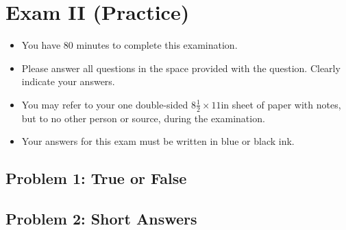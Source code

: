 \chapter{Exam II (Practice)}
\label{ch:examii-practice}

\begin{cluster}
\label{grp:prmbl:examii-practice::minutes}

\begin{preamble}
\label{prmbl:examii-practice::minutes}
\begin{itemize}
\item You have 80 minutes to complete this examination.
\item Please answer all questions in the space provided with the
  question.  Clearly indicate your answers.
\item You may refer to your one double-sided $8\frac{1}{2} \times 11$in
  sheet of paper with notes, but to no other person or source, during the
  examination.

\item Your answers for this exam must be written in blue or black ink.

\end{itemize}

\end{preamble}
\end{cluster}


\section{Problem 1: True or False}
\label{sec:examii-practice::problem-1-true-or-false}


\section{Problem 2: Short Answers}
\label{sec:examii-practice::problem-2-short-answers}

